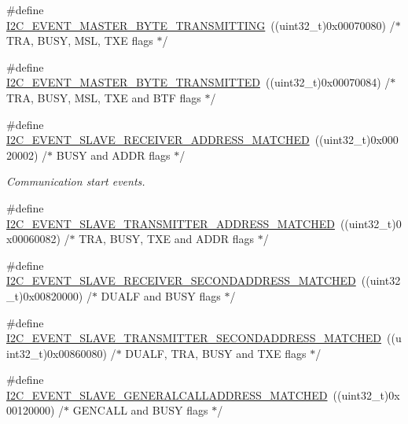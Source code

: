 \begin{DoxyCompactItemize}
\#define \mbox{\hyperlink{group___i2_c___events_ga037ac1e67e44ee085acac6f034bd73b2}{I2\+C\+\_\+\+E\+V\+E\+N\+T\+\_\+\+M\+A\+S\+T\+E\+R\+\_\+\+B\+Y\+T\+E\+\_\+\+T\+R\+A\+N\+S\+M\+I\+T\+T\+I\+NG}}~((uint32\+\_\+t)0x00070080) /$\ast$ T\+R\+A, B\+U\+S\+Y, M\+S\+L, T\+X\+E flags $\ast$/
\item 
\#define \mbox{\hyperlink{group___i2_c___events_ga8fe3b96b54e3c38e1de5d48536039c8f}{I2\+C\+\_\+\+E\+V\+E\+N\+T\+\_\+\+M\+A\+S\+T\+E\+R\+\_\+\+B\+Y\+T\+E\+\_\+\+T\+R\+A\+N\+S\+M\+I\+T\+T\+ED}}~((uint32\+\_\+t)0x00070084)  /$\ast$ T\+R\+A, B\+U\+S\+Y, M\+S\+L, T\+X\+E and B\+T\+F flags $\ast$/
\item 
\#define \mbox{\hyperlink{group___i2_c___events_ga6cf0e334704618b024eee604849f50f7}{I2\+C\+\_\+\+E\+V\+E\+N\+T\+\_\+\+S\+L\+A\+V\+E\+\_\+\+R\+E\+C\+E\+I\+V\+E\+R\+\_\+\+A\+D\+D\+R\+E\+S\+S\+\_\+\+M\+A\+T\+C\+H\+ED}}~((uint32\+\_\+t)0x00020002) /$\ast$ B\+U\+S\+Y and A\+D\+D\+R flags $\ast$/
\begin{DoxyCompactList}\small\item\em Communication start events. \end{DoxyCompactList}\item 
\#define \mbox{\hyperlink{group___i2_c___events_ga3fa381c1fd9a95c8ae13c6cc402b1327}{I2\+C\+\_\+\+E\+V\+E\+N\+T\+\_\+\+S\+L\+A\+V\+E\+\_\+\+T\+R\+A\+N\+S\+M\+I\+T\+T\+E\+R\+\_\+\+A\+D\+D\+R\+E\+S\+S\+\_\+\+M\+A\+T\+C\+H\+ED}}~((uint32\+\_\+t)0x00060082) /$\ast$ T\+R\+A, B\+U\+S\+Y, T\+X\+E and A\+D\+D\+R flags $\ast$/
\item 
\#define \mbox{\hyperlink{group___i2_c___events_ga17e78ab01fa980b3df10f8d9f6864c48}{I2\+C\+\_\+\+E\+V\+E\+N\+T\+\_\+\+S\+L\+A\+V\+E\+\_\+\+R\+E\+C\+E\+I\+V\+E\+R\+\_\+\+S\+E\+C\+O\+N\+D\+A\+D\+D\+R\+E\+S\+S\+\_\+\+M\+A\+T\+C\+H\+ED}}~((uint32\+\_\+t)0x00820000)  /$\ast$ D\+U\+A\+L\+F and B\+U\+S\+Y flags $\ast$/
\item 
\#define \mbox{\hyperlink{group___i2_c___events_ga6221aa204356bec9146f800ccfc99fc1}{I2\+C\+\_\+\+E\+V\+E\+N\+T\+\_\+\+S\+L\+A\+V\+E\+\_\+\+T\+R\+A\+N\+S\+M\+I\+T\+T\+E\+R\+\_\+\+S\+E\+C\+O\+N\+D\+A\+D\+D\+R\+E\+S\+S\+\_\+\+M\+A\+T\+C\+H\+ED}}~((uint32\+\_\+t)0x00860080)  /$\ast$ D\+U\+A\+L\+F, T\+R\+A, B\+U\+S\+Y and T\+X\+E flags $\ast$/
\item 
\#define \mbox{\hyperlink{group___i2_c___events_ga15195f6def95f688ae9725899f49ea23}{I2\+C\+\_\+\+E\+V\+E\+N\+T\+\_\+\+S\+L\+A\+V\+E\+\_\+\+G\+E\+N\+E\+R\+A\+L\+C\+A\+L\+L\+A\+D\+D\+R\+E\+S\+S\+\_\+\+M\+A\+T\+C\+H\+ED}}~((uint32\+\_\+t)0x00120000)  /$\ast$ G\+E\+N\+C\+A\+L\+L and B\+U\+S\+Y flags $\ast$/

\end{DoxyCompactItemize}

